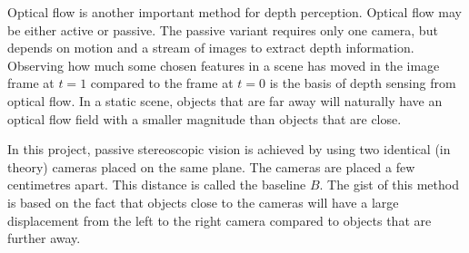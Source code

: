 Optical flow is another important method for depth perception. Optical flow may be either active or passive. The passive variant requires  only one camera, but depends on motion and a stream of images to extract depth information. Observing how much some chosen features in a scene has moved in the image frame at $t = 1$ compared to the frame at $t = 0$ is the basis of depth sensing from optical flow. In a static scene, objects that are far away will naturally have an optical flow field with a smaller magnitude than objects that are close. 

In this project, passive stereoscopic vision is achieved by using two identical (in theory) cameras placed on the same plane. The cameras are placed a few centimetres apart. This distance is called the baseline $B$. The gist of this method is based on the fact that objects close to the cameras will have a large displacement from the left to the right camera compared to objects that are further away. 
